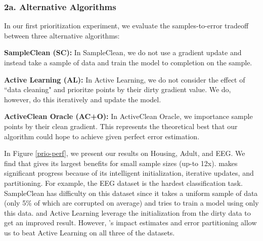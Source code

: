 \subsubsection{2a. Alternative Algorithms}
In our first prioritization experiment, we evaluate the samples-to-error tradeoff between three alternative algorithms:

\noindent\textbf{SampleClean (SC): } In SampleClean, we do not use a gradient update and instead take a sample of data and train the model to completion on the sample.

\noindent\textbf{Active Learning (AL): } In Active Learning, we do not consider the effect of ``data cleaning" and prioritze points by their dirty gradient value. We do, however, do this iteratively and update the model.

\noindent\textbf{ActiveClean Oracle (AC+O): } In ActiveClean Oracle, we importance sample points by their clean gradient. This represents the theoretical best that our algorithm could hope to achieve given perfect error estimation.

In Figure \ref{prio-perf}, we present our results on Housing, Adult, and EEG. 
We find that \sys gives its largest benefits for small sample sizes (up-to 12x).
\sys makes significant progress because of its intelligent initialization, iterative updates, and partitioning.
For example, the EEG dataset is the hardest classification task.
SampleClean has difficulty on this dataset since it takes a uniform sample of data (only 5\% of which are corrupted on average) and tries to train a model using only this data.
\sys and Active Learning leverage the initialization from the dirty data to get an improved result. 
However, \sys's impact estimates and error partitioning allow us to beat Active Learning on all three of the datasets.

